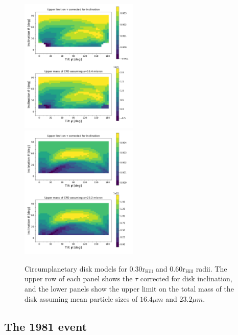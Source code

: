 \documentclass[longauth]{aa} %
\newcommand{\rhill}{$\mathrm{r_{Hill}}$} %
\begin{document}
\begin{figure}[htb]
    \includegraphics[width=0.50\textwidth]{diskfit_taumass_030.pdf}
    \includegraphics[width=0.50\textwidth]{diskfit_taumass_060.pdf}
    \caption{Circumplanetary disk  models for 0.30\rhill{} and  0.60\rhill{} radii. The upper row of each panel shows the $\tau$ corrected for disk inclination, and the lower panels show the upper limit on the total mass of the disk assuming mean particle sizes of $16.4\mu m$ and $23.2\mu m$.}
    \label{totalcpd}
\end{figure}


\subsection{The 1981 event }
\end{document}
